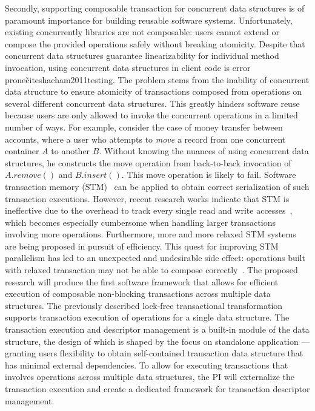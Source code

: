 \documentclass{article}
\begin{document}
Secondly, supporting composable transaction for concurrent data structures is of paramount importance for building reusable software systems.
Unfortunately, existing concurrently libraries are not composable: users cannot extend or compose the provided operations safely without breaking atomicity.
Despite that concurrent data structures guarantee linearizability for individual method invocation, using concurrent data structures in client code is error prone\~cite{shacham2011testing}.
The problem stems from the inability of concurrent data structure to ensure atomicity of transactions composed from operations on several different concurrent data structures.
This greatly hinders software reuse because users are only allowed to invoke the concurrent operations in a limited number of ways.
For example, consider the case of money transfer between accounts, where a user who attempts to \emph{move} a record from one concurrent container $A$ to another $B$.
Without knowing the nuances of using concurrent data structures, he constructs the move operation from back-to-back invocation of $A.remove()$ and $B.insert()$.
This move operation is likely to fail.
Software transaction memory (STM)~\cite{shavit1997software,herlihy2003software} can be applied to obtain correct serialization of such transaction executions.
However, recent research works indicate that STM is ineffective due to the overhead to track every single read and write accesses~\cite{cascaval2008software,herlihy2008transactional}, which becomes especially cumbersome when handling larger transactions involving more operations.
Furthermore, more and more relaxed STM systems are being proposed in pursuit of efficiency.
This quest for improving STM parallelism has led to an unexpected and undesirable side effect: operations built with relaxed transaction may not be able to compose correctly~\cite{gramoli2013composing,gramoli2010many}.
The proposed research will produce the first software framework that allows for efficient execution of composable non-blocking transactions across multiple data structures.
The previously described lock-free transactional transformation supports transaction execution of operations for a single data structure. 
The transaction execution and descriptor management is a built-in module of the data structure, the design of which is shaped by the focus on standalone application --- granting users flexibility to obtain self-contained transaction data structure that has minimal external dependencies.
To allow for executing transactions that involves operations across multiple data structures, the PI will externalize the transaction execution and create a dedicated framework for transaction descriptor management.  
\end{document}
